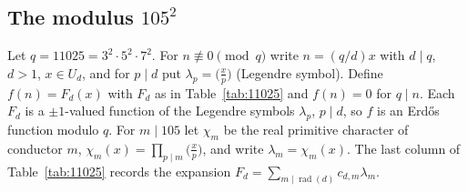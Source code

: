 \documentclass[11pt]{amsart}
\theoremstyle{definition}
\theoremstyle{remark}
\DeclareMathOperator{\rad}{rad}
\numberwithin{equation}{section}
\begin{document}
\subsection{\texorpdfstring{The modulus $105^2$}{The modulus 105^2}}
Let $q=11025=3^2\cdot5^2\cdot7^2$.
For $n\not\equiv0\pmod q$ write $n=(q/d)x$ with $d\mid q$, $d>1$, $x\in U_d$, and for $p\mid d$ put $\lambda_p=\bigl(\frac xp\bigr)$ (Legendre symbol).
Define $f(n)=F_d(x)$ with $F_d$ as in Table~\ref{tab:11025} and $f(n)=0$ for $q\mid n$.
Each $F_d$ is a $\pm1$-valued function of the Legendre symbols $\lambda_p$, $p\mid d$, so $f$ is an Erd\H{o}s function modulo $q$.
For $m\mid105$ let $\chi_m$ be the real primitive character of conductor $m$, $\chi_m(x)=\prod_{p\mid m}\bigl(\frac xp\bigr)$, and write $\lambda_m=\chi_m(x)$.
The last column of Table~\ref{tab:11025} records the expansion $F_d=\sum_{m\mid\rad(d)}c_{d,m}\lambda_m$.
\end{document}
